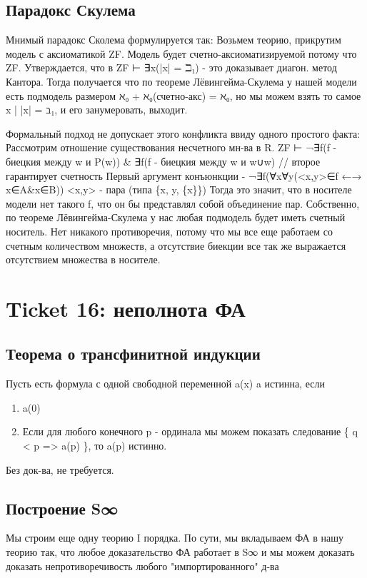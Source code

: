 \documentclass[11pt]{article}
\begin{document}
\subsection{Парадокс Скулема}
\label{sec-17-4}
Мнимый парадокс Сколема формулируется так:
Возьмем теорию, прикрутим модель с аксиоматикой ZF. Модель
будет счетно-аксиоматизируемой потому что ZF.
Утверждается, что в ZF ⊢ ∃x(|x| = ℶ₁) - это доказывает диагон.
метод Кантора.
Тогда получается что по теореме Лёвингейма-Скулема у нашей
модели есть подмодель размером ℵ₀ + ℵ₀(счетно-акс) = ℵ₀, но
мы можем взять то самое x | |x| = ℶ₁, и его занумеровать, выходит.

Формальный подход не допускает этого конфликта ввиду одного
простого факта:
Рассмотрим отношение существования несчетного мн-ва в R.
ZF ⊢ ¬∃f(f - биецкия между w и P(w)) \& ∃f(f - биецкия между w и w∪w)
// второе гарантирует счетность
Первый аргумент конъюнкции - ¬∃f(∀x∀y(<x,y>∈f ←→ x∈A\&x∈B))
<x,y> - пара (типа \{x, y, \{x\}\})
Тогда это значит, что в носителе модели нет такого f, что он
бы представлял собой объединение пар.
Собственно, по теореме Лёвингейма-Скулема у нас любая подмодель
будет иметь счетный носитель. Нет никакого противоречия, потому
что мы все еще работаем со счетным количеством множеств, а
отсутствие биекции все так же выражается отсутствием множества
в носителе.
\section{Ticket 16: неполнота ФА}
\label{sec-18}
\subsection{Теорема о трансфинитной индукции}
\label{sec-18-1}
Пусть есть формула с одной свободной переменной a(x)
a истинна, если
\begin{enumerate}
\item a(0)
\item Если для любого конечного p - ординала мы можем
показать следование \{ q < p => a(p) \}, то a(p) истинно.
\end{enumerate}

Без док-ва, не требуется.

\subsection{Построение S∞}
\label{sec-18-2}
Мы строим еще одну теорию I порядка.
По сути, мы вкладываем ФА в нашу теорию так, что
любое доказательство ФА работает в S∞ и мы можем доказать
доказать непротиворечивость любого "импортированного" д-ва
\end{document}
